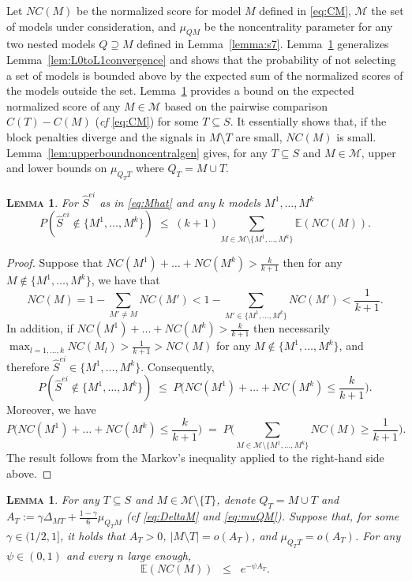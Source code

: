 \documentclass[
  12pt]{article}
\newcommand{\E}{\mathbb{E}}
\newcommand{\M}{\mathcal{M}}
\newtheorem{lem}[thm]{\textsc{Lemma}}
\begin{document}
Let $NC(M)$ be the normalized score for model $M$ defined in \eqref{eq:CM}, $\M$ the set of models under consideration, and $\mu_{Q M}$ be the noncentrality parameter for any two nested models $Q \supseteq M$ defined in Lemma~\ref{lemma:s7}. Lemma~\ref{lem:L0toL1convergencegen} generalizes Lemma~\ref{lem:L0toL1convergence} and shows that the probability of not selecting a set of models is bounded above by the expected sum of the normalized scores of the models outside the set. Lemma~\ref{lem:boundexpnc} provides a bound on the expected normalized score of any $M \in \M$ based on the pairwise comparison $C(T)-C(M)$ (\emph{cf} \eqref{eq:CM}) for some $T\subseteq S$. It essentially shows that, if the block penalties diverge and the signals in $M\setminus T$ are small, $NC(M)$ is small.  Lemma~\ref{lem:upperboundnoncentralgen} gives, for any $T\subseteq S$ and $M\in \M$, upper and lower bounds on $\mu_{Q_TT}$ where $Q_T=M\cup T$.

\begin{lem}\label{lem:L0toL1convergencegen} For $\hat{S}^{ei}$ as in \eqref{eq:Mhat} and any $k$ models $M^1,\ldots,M^k$
$$P(\hat{S}^{ei}\not\in \{M^1,\ldots,M^k\})\;\leq\; (k+1) \sum_{M \in \M\setminus \{M^1,\ldots,M^k\}}\E\left( NC(M)\right).$$
\end{lem}

\begin{proof}
Suppose that $NC(M^1)+\ldots+NC(M^k)>\frac{k}{k+1}$ then for any $M\not\in \{M^1,\ldots,M^k\}$, we have that
$$NC(M)= 1-\sum_{M' \neq M} NC(M') < 1 - \sum_{M' \in \{M^1,\ldots,M^k\}} NC(M') < \frac{1}{k+1}.$$ 
In addition, if $NC(M^1)+\ldots+NC(M^k)>\frac{k}{k+1}$ then necessarily $\max_{l=1,\ldots,k}NC(M_l)> \frac{1}{k+1} > NC(M) $ for any $M \not\in \{M^1,\ldots,M^k\}$, and therefore $\hat{S}^{ei}\in \{M^1,\ldots,M^k\}$. Consequently, 
$$
P(\hat{S}^{ei}\not\in \{M^1,\ldots,M^k\})\; \leq\; P\Big(NC(M^1)+\ldots+NC(M^k)\leq\frac{k}{k+1}\Big).$$
Moreover, we have
$$P\Big(NC(M^1)+\ldots+NC(M^k)\leq\frac{k}{k+1}\Big)\;=\;P\Big(\sum_{M \in \M\setminus \{M^1,\ldots,M^k\}} NC(M)\geq \frac{1}{k+1}\Big).$$
The result follows from the Markov's inequality applied to the right-hand side above.
\end{proof}

\begin{lem}\label{lem:boundexpnc} For any $T\subseteq S$ and $M\in \M\setminus\{T\}$, denote $Q_T= M\cup T$ and $A_T:=\gamma\Delta_{MT}+\tfrac{1-\gamma}{6}\mu_{Q_TM}$ (\emph{cf} \eqref{eq:DeltaM} and \eqref{eq:muQM}). Suppose that, for some $\gamma \in (1/2,1]$, it holds that $A_T>0$, $|M\setminus T|=o(A_T)$, and $\mu_{Q_T T}=o(A_T)$. For any $\psi\in(0,1)$ and every $n$ large enough,
$$\E\left(NC(M)\right)  \;\;\leq\;\; e^{-\psi A_T}.$$
\end{lem}
\end{document}
